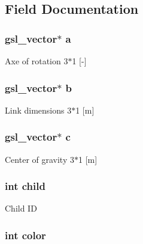 \subsection{Field Documentation}
\hypertarget{struct_stu_l_i_n_k_a1e723aadb35dfd08573b83d519898158}{
\subsubsection[{a}]{\setlength{\rightskip}{0pt plus 5cm}gsl\-\_\-vector$\ast$ a}}\label{struct_stu_l_i_n_k_a1e723aadb35dfd08573b83d519898158}
Axe of rotation 3$\ast$1 \mbox{[}-\/\mbox{]} \hypertarget{struct_stu_l_i_n_k_acf1a2ff4b1eba679780b9e131acf36e8}{
\subsubsection[{b}]{\setlength{\rightskip}{0pt plus 5cm}gsl\-\_\-vector$\ast$ b}}\label{struct_stu_l_i_n_k_acf1a2ff4b1eba679780b9e131acf36e8}
Link dimensions 3$\ast$1 \mbox{[}m\mbox{]} \hypertarget{struct_stu_l_i_n_k_a108b1b851d2b9f8d8f89a622f0bb90ea}{
\subsubsection[{c}]{\setlength{\rightskip}{0pt plus 5cm}gsl\-\_\-vector$\ast$ c}}\label{struct_stu_l_i_n_k_a108b1b851d2b9f8d8f89a622f0bb90ea}
Center of gravity 3$\ast$1 \mbox{[}m\mbox{]} \hypertarget{struct_stu_l_i_n_k_a4d7e3f55d165c752486b8f10d9af6b56}{
\subsubsection[{child}]{\setlength{\rightskip}{0pt plus 5cm}int child}}\label{struct_stu_l_i_n_k_a4d7e3f55d165c752486b8f10d9af6b56}
Child I\-D \hypertarget{struct_stu_l_i_n_k_a0fd02fb9277ffcb35a75066ffe95e8c7}{
\subsubsection[{color}]{\setlength{\rightskip}{0pt plus 5cm}int color}}\label{struct_stu_l_i_n_k_a0fd02fb9277ffcb35a75066ffe95e8c7}
